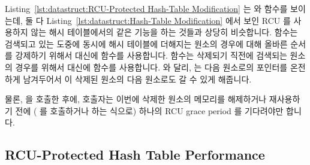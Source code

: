 Listing~\ref{lst:datastruct:RCU-Protected Hash-Table Modification} 는
 와  함수를 보이는데, 둘 다
Listing~\ref{lst:datastruct:Hash-Table Modification} 에서 보인 RCU 를 사용하지
않는 해시 테이블에서의 같은 기능을 하는 것들과 상당히 비슷합니다.
 함수는 검색되고 있는 도중에 동시에 해시 테이블에 더해지는
원소의 경우에 대해 올바른 순서를 강제하기 위해서  대신에
 함수를 사용합니다.
 함수는 삭제되기 직전에 검색되는 원소의 경우를 위해서
 대신에  함수를 사용합니다.
 와 달리,  는 다음 원소로의
포인터를 온전하게 남겨두어서  이 삭제된 원소의 다음
원소로도 갈 수 있게 해줍니다.

물론,  을 호출한 후에, 호출자는 이번에 삭제한 원소의 메모리를
해제하거나 재사용하기 전에 ( 를 호출하거나 하는 식으로)
하나의 RCU grace period 를 기다려야만 합니다.

\subsection{RCU-Protected Hash Table Performance}
\label{sec:datastruct:RCU-Protected Hash Table Performance}

